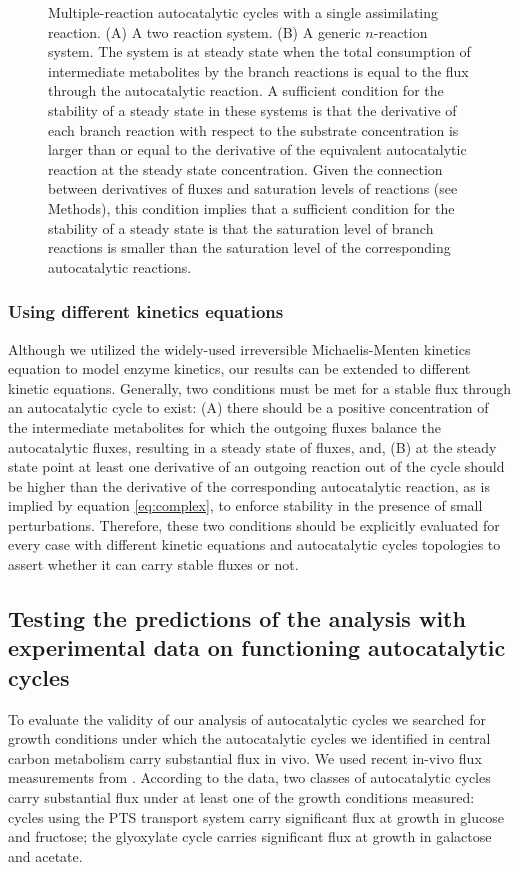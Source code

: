 \begin{figure}[h!]
  \centering 
      
     \caption{
     Multiple-reaction autocatalytic cycles with a single assimilating reaction.
     (A) A two reaction system.
     (B) A generic $n$-reaction system.
     The system is at steady state when the total consumption of intermediate metabolites by the branch reactions is equal to the flux through the autocatalytic reaction.
     A sufficient condition for the stability of a steady state in these systems is that the derivative of each branch reaction with respect to the substrate concentration is larger than or equal to the derivative of the equivalent autocatalytic reaction at the steady state concentration.
     Given the connection between derivatives of fluxes and saturation levels of reactions (see Methods), this condition implies that a sufficient condition for the stability of a steady state is that the saturation level of branch reactions is smaller than the saturation level of the corresponding autocatalytic reactions.
 }
     \label{fig:multiple}
\end{figure}
    \subsubsection{Using different kinetics equations}
    Although we utilized the widely-used irreversible Michaelis-Menten kinetics equation to model enzyme kinetics, our results can be extended to different kinetic equations.
    Generally, two conditions must be met for a stable flux through an autocatalytic cycle to exist: (A) there should be a positive concentration of the intermediate metabolites for which the outgoing fluxes balance the autocatalytic fluxes, resulting in a steady state of fluxes, and, (B) at the steady state point at least one derivative of an outgoing reaction out of the cycle should be higher than the derivative of the corresponding autocatalytic reaction, as is implied by equation \ref{eq:complex}, to enforce stability in the presence of small perturbations.
    Therefore, these two conditions should be explicitly evaluated for every case with different kinetic equations and autocatalytic cycles topologies to assert whether it can carry stable fluxes or not.

    \subsection{Testing the predictions of the analysis with experimental data on functioning autocatalytic cycles}
    To evaluate the validity of our analysis of autocatalytic cycles we searched for growth conditions under which the autocatalytic cycles we identified in central carbon metabolism carry substantial flux in vivo.
    We used recent in-vivo flux measurements from \cite{Gerosa2015-oq}.  
    According to the data, two classes of autocatalytic cycles carry substantial flux under at least one of the growth conditions measured:
    cycles using the PTS transport system carry significant flux at growth in glucose and fructose;
    the glyoxylate cycle carries significant flux at growth in galactose and acetate.


